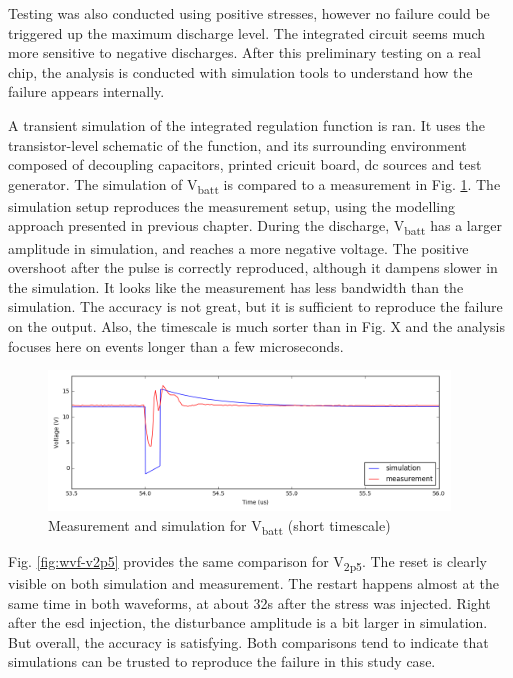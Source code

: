 Testing was also conducted using positive stresses, however no failure could be triggered up the maximum discharge level.
The integrated circuit seems much more sensitive to negative discharges.
After this preliminary testing on a real chip, the analysis is conducted with simulation tools to understand how the failure appears internally.

A transient simulation of the integrated regulation function is ran.
It uses the transistor-level schematic of the function, and its surrounding environment composed of decoupling capacitors, printed cricuit board, \gls{dc} sources and test generator.
The simulation of V\textsubscript{batt} is compared to a measurement in Fig. \ref{fig:wvf-vbatt}.
The simulation setup reproduces the measurement setup, using the modelling approach presented in previous chapter.
During the discharge, V\textsubscript{batt} has a larger amplitude in simulation, and reaches a more negative voltage.
The positive overshoot after the pulse is correctly reproduced, although it dampens slower in the simulation.
It looks like the measurement has less bandwidth than the simulation.
The accuracy is not great, but it is sufficient to reproduce the failure on the output.
Also, the timescale is much sorter than in Fig. X and the analysis focuses here on events longer than a few microseconds.

\begin{figure}[!h]
  \centering
  \includegraphics[width=0.95\textwidth]{src/3/figures/vbatt.png}
  \caption{Measurement and simulation for V\textsubscript{batt} (short timescale)}
  \label{fig:wvf-vbatt}
\end{figure}

Fig. \ref{fig:wvf-v2p5} provides the same comparison for V\textsubscript{2p5}.
The reset is clearly visible on both simulation and measurement.
The restart happens almost at the same time in both waveforms, at about 32\textmu{}s after the stress was injected.
Right after the \gls{esd} injection, the disturbance amplitude is a bit larger in simulation.
But overall, the accuracy is satisfying.
Both comparisons tend to indicate that simulations can be trusted to reproduce the failure in this study case.

